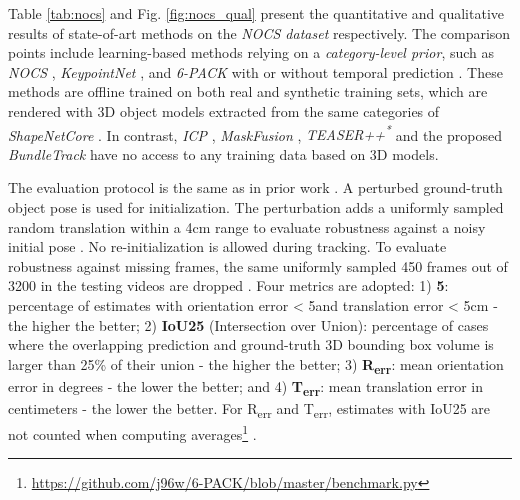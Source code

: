 \documentclass[letterpaper, 10 pt, conference]{ieeeconf}
\begin{document}
Table \ref{tab:nocs} and Fig. \ref{fig:nocs_qual} present the quantitative  and qualitative results of state-of-art methods on the \textit{NOCS dataset} respectively. The comparison points include learning-based methods relying on a \textit{category-level prior}, such as \textit{NOCS} \cite{Wang_2019_CVPR}, \textit{KeypointNet} \cite{suwajanakorn2018discovery},  and \textit{6-PACK} with or without temporal prediction \cite{wang20196-pack}. These methods are offline trained on both real and synthetic training sets, which are rendered with 3D object models extracted from the same categories of \textit{ShapeNetCore} \cite{chang2015shapenet}.
In contrast, \textit{ICP} \cite{zhou2018open3d}, \textit{MaskFusion} \cite{runz2018maskfusion}, \textit{TEASER++\textsuperscript{*}} \cite{Yang20troteaser} and the proposed \textit{BundleTrack} have no access to any training data based on 3D models. 

The evaluation protocol is the same as in prior work  \cite{wang20196-pack}. A perturbed ground-truth object pose is used for initialization. The perturbation adds a uniformly sampled random translation within a 4cm range to evaluate robustness against a noisy initial pose \cite{wang20196-pack}. No re-initialization is allowed during tracking. To evaluate robustness against missing frames, the same uniformly sampled 450 frames out of 3200 in the testing videos are dropped \cite{wang20196-pack}. Four metrics are adopted: 1) \textbf{5}: percentage of estimates with orientation error < 5\degree and translation error < 5cm - the higher the better; 2) \textbf{IoU25} (Intersection over Union): percentage of cases where the overlapping prediction and ground-truth 3D bounding box volume is larger than 25\% of their union - the higher the better; 3) \textbf{R\textsubscript{err}}: mean orientation error in degrees - the lower the better; and 4) \textbf{T\textsubscript{err}}: mean translation error in centimeters - the lower the better. For  R\textsubscript{err} and T\textsubscript{err}, estimates with IoU25 are not counted when computing averages\footnote{\href{https://github.com/j96w/6-PACK/blob/master/benchmark.py}{https://github.com/j96w/6-PACK/blob/master/benchmark.py}} \cite{wang20196-pack}. 
 
\end{document}
